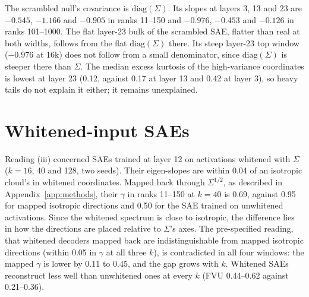 \documentclass{article}
\newcommand{\Sig}{\Sigma}
\begin{document}
The scrambled null's covariance is $\mathrm{diag}(\Sig)$. Its slopes at layers 3, 13 and 23 are $-0.545$, $-1.166$ and $-0.905$ in ranks 11--150 and $-0.976$, $-0.453$ and $-0.126$ in ranks 101--1000. The flat layer-23 bulk of the scrambled SAE, flatter than real at both widths, follows from the flat $\mathrm{diag}(\Sig)$ there. Its steep layer-23 top window ($-0.976$ at 16k) does not follow from a small denominator, since $\mathrm{diag}(\Sig)$ is steeper there than $\Sig$. The median excess kurtosis of the high-variance coordinates is lowest at layer 23 (0.12, against 0.17 at layer 13 and 0.42 at layer 3), so heavy tails do not explain it either; it remains unexplained.

\section{Whitened-input SAEs}
\label{app:whiten}

\begin{table}[!htb]
\centering
\caption{Whitened-input SAEs at layer 12 (width 16,384, mean of two seeds). Left: decoder eigen-slope in whitened coordinates minus that of an isotropic cloud of the same size (all live rows). Middle: $\gamma$ at 8,192 live latents of the decoder mapped back to the original space, of isotropic whitened-space directions mapped the same way, and of the SAE trained on the same tokens without whitening. Right: eval FVU.}
\label{tab:whiten}
\footnotesize
\setlength{\tabcolsep}{2.5pt}

\end{table}

Reading (iii) concerned SAEs trained at layer 12 on activations whitened with $\Sig$ ($k=16$, 40 and 128, two seeds). Their eigen-slopes are within 0.04 of an isotropic cloud's in whitened coordinates. Mapped back through $\Sig^{1/2}$, as described in Appendix~\ref{app:methods}, their $\gamma$ in ranks 11--150 at $k=40$ is 0.69, against 0.95 for mapped isotropic directions and 0.50 for the SAE trained on unwhitened activations. Since the whitened spectrum is close to isotropic, the difference lies in how the directions are placed relative to $\Sig$'s axes. The pre-specified reading, that whitened decoders mapped back are indistinguishable from mapped isotropic directions (within 0.05 in $\gamma$ at all three $k$), is contradicted in all four windows: the mapped $\gamma$ is lower by 0.11 to 0.45, and the gap grows with $k$. Whitened SAEs reconstruct less well than unwhitened ones at every $k$ (FVU 0.44--0.62 against 0.21--0.36).
\end{document}
